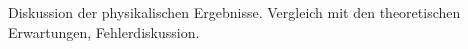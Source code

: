 Diskussion der physikalischen Ergebnisse.
Vergleich mit den theoretischen Erwartungen, Fehlerdiskussion.